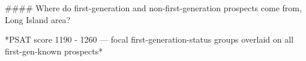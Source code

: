 #### Where do first-generation and non-first-generation prospects come from, Long Island area?

*PSAT score 1190 - 1260 — focal first-generation-status groups overlaid on all first-gen-known prospects*
